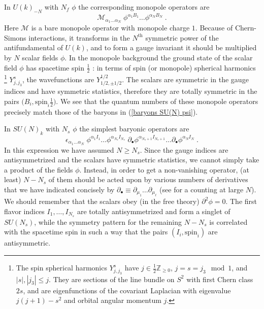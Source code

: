 \documentclass[a4paper, 12pt]{article}
\numberwithin{equation}{section}
\newcommand{\be}{\begin{equation}} \newcommand{\ee}{\end{equation}}
\newcommand{\cM}{\mathcal{M}}
\newcommand{\bZ}{\mathbb{Z}}
\begin{document}
In $U(k)_{-N}$ with $N_f$ $\phi$ the corresponding monopole operators are
\be
\cM_{\alpha_1 \ldots \alpha_N} \; \phi^{\alpha_1B_1} \ldots \phi^{\alpha_N B_N} \;.
\ee
Here $\cM$ is a bare monopole operator with monopole charge $1$. Because of Chern-Simons interactions, it transforms in the $N^\text{th}$ symmetric power of the antifundamental of $U(k)$, and to form a gauge invariant it should be multiplied by $N$ scalar fields $\phi$. In the monopole background the ground state of the scalar field $\phi$ has spacetime spin $\frac12$ \cite{Wu:1976ge}: in terms of spin (or monopole) spherical harmonics%
\footnote{The spin spherical harmonics $Y^s_{j,j_3}$ have $j \in \frac12 \bZ_{\geq 0}$, $j=s=j_3 \mod 1$, and $|s|, |j_3| \leq j$. They are sections of the line bundle on $S^2$ with first Chern class $2s$, and are eigenfunctions of the covariant Laplacian with eigenvalue $j(j+1)-s^2$ and orbital angular momentum $j$.}
$Y^s_{j,j_3}$, the wavefunctions are $Y^{1/2}_{1/2, \pm1/2}$. The scalars are symmetric in the gauge indices and have symmetric statistics, therefore they are totally symmetric in the pairs $\big( B_i, \text{spin}_i \frac12 \big)$. We see that the quantum numbers of these monopole operators precisely match those of the baryons in (\ref{baryons SU(N) psi}).

In $SU(N)_k$ with $N_s$ $\phi$ the simplest baryonic operators are
\be
\label{baryons SU(N) phi}
\epsilon_{\alpha_1 \ldots \alpha_N} \; \phi^{\alpha_1 I_1} \ldots \phi^{\alpha_{N_s} I_{N_s}} \; \partial_\bullet \phi^{\alpha_{N_s+1} I_{N_s+1}} \ldots \partial_\bullet\phi^{\alpha_N I_N} \;.
\ee
In this expression we have assumed $N \geq N_s$. Since the gauge indices are antisymmetrized and the scalars have symmetric statistics, we cannot simply take a product of the fields $\phi$. Instead, in order to get a non-vanishing operator, (at least) $N-N_s$ of them should be acted upon by various numbers of derivatives that we have indicated concisely by $\partial_\bullet \equiv \partial_{\mu_1} \dots \partial_{\mu_\ell}$ (see \cite{Shenker:2011zf} for a counting at large $N$). We should remember that the scalars obey (in the free theory) $\partial^2 \phi = 0$. The first flavor indices $I_1, \dots, I_{N_s}$ are totally antisymmetrized and form a singlet of $SU(N_s)$, while the symmetry pattern for the remaining $N-N_s$ is correlated with the spacetime spin in such a way that the pairs $(I_i, \text{spin}_i)$ are antisymmetric.
\end{document}
